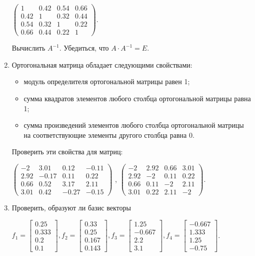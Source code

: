 \begin{enumerate}
$\left(\begin{matrix}
1&0.42&0.54&0.66\\
0.42&1&0.32&0.44\\
0.54&0.32&1&0.22\\
0.66&0.44&0.22&1
\end{matrix}\right)$.

Вычислить  $A^{-1}$. Убедиться, что  $A\cdot A^{-1}=E$.
\item Ортогональная матрица обладает следующими свойствами: 
\begin{itemize}
\item модуль определителя ортогональной матрицы равен 1; 
\item сумма квадратов элементов любого столбца ортогональной матрицы равна 1; 
\item сумма произведений элементов любого столбца ортогональной матрицы на соответствующие элементы другого столбца
равна 0. 
\end{itemize}
Проверить эти свойства для матриц: 

$\left(\begin{matrix}-2&3.01&0.12&-0.11\\2.92&-0.17&0.11&0.22\\0.66&0.52&3.17&2.11\\3.01&0.42&-0.27&-0.15\end{matrix}\right)$
, $\left(\begin{matrix}-2&2.92&0.66&3.01\\2.92&-2&0.11&0.22\\0.66&0.11&-2&2.11\\3.01&0.22&2.11&-2\end{matrix}\right)$.
\item Проверить, образуют ли базис векторы
 
$f_1=\left[\begin{matrix}0.25\\0.333\\0.2\\0.1\end{matrix}\right],f_2=\left[\begin{matrix}0.33\\0.25\\0.167\\0.143\end{matrix}\right],f_3=\left[\begin{matrix}1.25\\-0.667\\2.2\\3.1\end{matrix}\right],f_4=\left[\begin{matrix}-0.667\\1.333\\1.25\\-0.75\end{matrix}\right]$. 


\end{enumerate}
